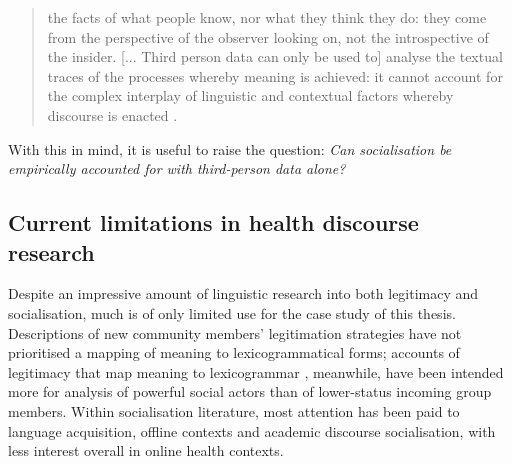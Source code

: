 \begin{quote}\small\singlespacing
the facts of what people know, nor what they think they do: they come from the perspective of the observer looking on, not the introspective of the insider. [... Third person data can only be used to] analyse the textual traces of the processes whereby meaning is achieved: it cannot account for the complex interplay of linguistic and contextual factors whereby discourse is enacted \parencite*[pp.~6--7]{widdowson_limitations_2000}.
\end{quote}
%
With this in mind, it is useful to raise the question: \emph{Can socialisation be empirically accounted for with third\hyp{}person data alone?}

\subsection{Current limitations in health discourse research}

Despite an impressive amount of linguistic research into both legitimacy and socialisation, much is of only limited use for the case study of this thesis. Descriptions of new community members' legitimation strategies have not prioritised a mapping of meaning to lexicogrammatical forms; accounts of legitimacy that map meaning to lexicogrammar \cite[e.g.][]{van_leeuwen_legitimation_2007,reyes_strategies_2011}, meanwhile, have been intended more for analysis of powerful social actors than of lower-status incoming group members. Within socialisation literature, most attention has been paid to language acquisition, offline contexts and academic discourse socialisation, with less interest overall in online health contexts.


